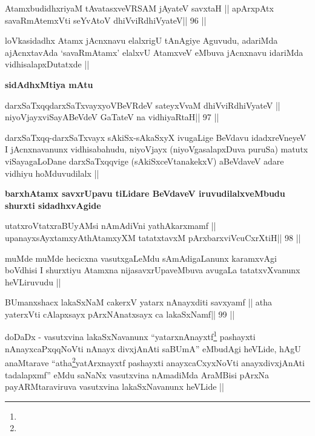 \begin{shl}
AtamxbudidhxriyaM tAvatasxveVRSAM jAyateV savxtaH ||
apArxpAtx savaRmAtemxVti seYvAtoV dhiVviRdhiVyateV\hfill || 96 ||
\end{shl}

\begin{artha}
loVkasidadhx Atamx jAcnxnavu elalxrigU tAnAgiye Aguvudu, adariMda
ajAcnxtavAda `savaRmAtamx' elalxvU AtamxveV eMbuva jAcnxnavu idariMda
vidhisalapxDutatxde ||
\end{artha}

\begin{artha}
\textbf{sidAdhxMtiya mAtu}
\end{artha}

\begin{shl}
darxSaTxqqdarxSaTxvayxyoVBeVRdeV sateyxVvaM dhiVviRdhiVyateV ||
niyoVjayxviSayABeVdeV GaTateV na vidhiyaRtaH\hfill || 97 ||
\end{shl}

\begin{artha}
darxSaTxqq-darxSaTxvayx sAkiSx-sAkaSxyX ivugaLige BeVdavu
idadxreVneyeV I jAcnxnavanunx vidhisabahudu, niyoVjayx
(niyoVgasalapxDuva puruSa) matutx viSayagaLoDane darxSaTxqqvige
(sAkiSxceVtanakekxV) aBeVdaveV adare vidhiyu hoMduvudilalx || 
\end{artha}

\begin{artha}
\textbf{barxhAtamx savxrUpavu tiLidare BeVdaveV iruvudilalxveMbudu shurxti sidadhxvAgide}
\end{artha}

\begin{shl}
\footnotemark[1]utatxroVtatxraBUyAMsi nAmAdiVni yathAkarxmamf ||
upanayxsAyx\s\s tamxyAthAtamxyXM tatatxtavxM pArxbarxviVcuCxrXtiH\hfill || 98 ||
\end{shl}

\begin{artha}
muMde muMde hecicxna vasutxgaLeMdu sAmAdigaLanunx karamxvAgi boVdhisi
I shurxtiyu Atamxna nijasavxrUpaveMbuva avugaLa tatatxvXvanunx
heVLiruvudu ||
\end{artha}

\begin{shl}
BUmanxshacx lakaSxNaM cakerxV yatarx nAnayxditi savxyamf ||
atha yaterxVti cAlapxsayx pArxNAnatxsayx ca lakaSxNamf\hfill || 99 ||
\end{shl}

\begin{artha}
doDaDx - vasutxvina lakaSxNavanunx ``yatarxnAnayxtf\footnote[2]{}
pashayxti nAnayxcaPxqqNoVti nAnayx divxjAnAti saBUmA'' eMbudAgi
heVLide, hAgU anaMtarave ``atha\footnote[3]{}yatArxnayxtf pashayxti
anayxcaCxyxNoVti anayxdivxjAnAti tadalapxmf'' eMdu saNaNx vasutxvina
nAmadiMda AraMBisi pArxNa payARMtaraviruva vasutxvina lakaSxNavanunx
heVLide || 
\end{artha}

